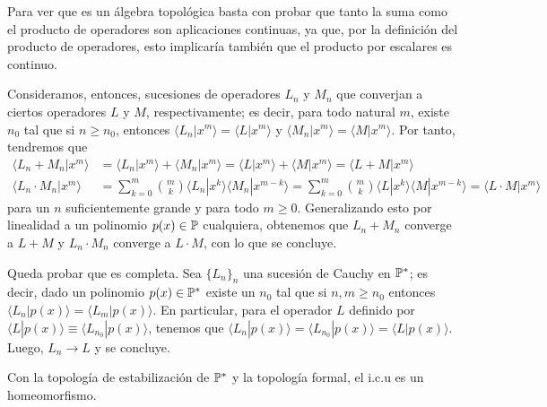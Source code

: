 \begin{demo}
    Para ver que es un álgebra topológica basta con probar que tanto la suma como el producto de operadores son aplicaciones continuas, ya que, por la definición del producto de operadores, esto implicaría también que el producto por escalares es continuo. 
    
    Consideramos, entonces, sucesiones de operadores $L_n$ y $M_n$ que converjan a ciertos operadores $L$ y $M$, respectivamente; es decir, para todo natural $m$, existe $n_0$ tal que si $n \geq n_0$, entonces $\langle L_n | x^m \rangle = \langle L | x^m \rangle$ y $\langle M_n | x^m \rangle = \langle M | x^m \rangle$. Por tanto, tendremos que
    \begin{align*}
        \langle L_n + M_n | x^m \rangle & = \langle L_n | x^m \rangle + \langle M_n | x^m \rangle  = \langle L | x^m \rangle + \langle M | x^m \rangle = \langle L + M | x^m \rangle  \\
        \langle L_n \cdot M_n | x^m \rangle & = \sum_{k=0}^m \binom{m}{k}\langle L_n | x^k \rangle \langle M_n | x^{m-k} \rangle = \sum_{k=0}^m \binom{m}{k}\langle L | x^k \rangle \langle M | x^{m-k} \rangle = \langle L \cdot M | x^m \rangle
    \end{align*}
    para un $n$ suficientemente grande y para todo $m \geq 0$. Generalizando esto por linealidad a un polinomio $p(x) \in \mathbb{P}$ cualquiera, obtenemos que $L_n + M_n$ converge a $L + M$ y $L_n \cdot M_n$ converge a $L \cdot M$, con lo que se concluye.

    Queda probar que es completa. Sea $\{L_n\}_{n}$ una sucesión de Cauchy en $\mathbb{P}^*$; es decir, dado un polinomio $p(x) \in \mathbb{P}^*$ existe un $n_0$ tal que si $n, m \geq n_0$ entonces $\langle L_n | p(x) \rangle = \langle L_m | p(x) \rangle $. En particular, para el operador $L$ definido por $\langle L | p(x) \rangle \equiv \langle L_{n_0} | p(x) \rangle $, tenemos que $\langle L_n | p(x) \rangle = \langle L_{n_0} | p(x) \rangle = \langle L | p(x) \rangle$. Luego, $L_n \longrightarrow L$ y se concluye.
\end{demo}

\begin{proposicion}
    Con la topología de estabilización de $\mathbb{P}^*$ y la topología formal, el i.c.u es un homeomorfismo.
\end{proposicion}

